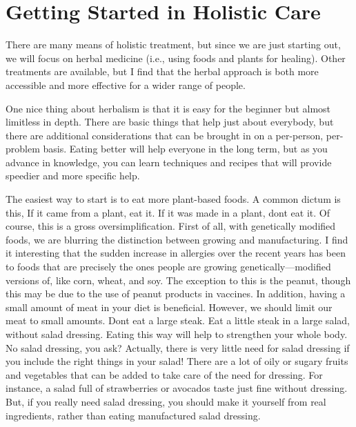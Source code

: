 \documentclass[letterpaper]{article}
\begin{document}
\section{Getting Started in Holistic Care}
{\color{black}
There are many means of holistic treatment,
\textcolor[rgb]{0.32941177,0.5529412,0.83137256}{but }since we are just
starting out, we will focus on herbal medicine
\textcolor[rgb]{0.32941177,0.5529412,0.83137256}{(i.e., }using foods
and plants for
healing\textcolor[rgb]{0.32941177,0.5529412,0.83137256}{)}. Other
treatments are available, but I find that the herbal approach is both
more accessible and more effective for a wider
\textcolor[rgb]{0.32941177,0.5529412,0.83137256}{range} of people.}

{\color{black}
One nice thing about herbalism is that it is easy for the beginner but
almost limitless in depth. There are basic things that help just about
everybody, but there are additional considerations that can be brought
in on a per-person, per-problem basis. Eating better will help everyone
in the long term, but as you advance in knowledge, you can learn
techniques and recipes that will provide speedier and more specific
help. }

{\color{black}
The easiest way to start is to eat more plant-based foods. A common
dictum is this, {\textquotedbl}If it came from a plant, eat it. If it
was made in a plant, don{\textquotesingle}t eat it.{\textquotedbl}  Of
course, this is a gross oversimplification. First of all, with
genetically modified foods, we are blurring the distinction between
growing and manufacturing. I find it interesting that the sudden
increase in allergies over the recent years has been to foods that are
precisely the ones people are growing genetically—modified versions of,
like corn, wheat, and soy. The exception to this is the peanut, though
this may be due to the use of peanut products in vaccines. In addition,
having a small amount of meat in your diet is beneficial. However, we
should limit our meat to small amounts. Don{\textquotesingle}t eat a
large steak. Eat a little steak in a large salad, without salad
dressing. Eating this way will help to strengthen your whole body.  No
salad dressing, you ask?  Actually, there is very little need for salad
dressing if you include the right things in your salad!  There are a
lot of oily or sugary fruits and vegetables that can be added to take
care of the need for dressing.  For instance, a salad full of
strawberries or avocados taste just fine without dressing.  But, if you
really need salad dressing, you should make it yourself from real
ingredients, rather than eating manufactured salad dressing.}
\end{document}
